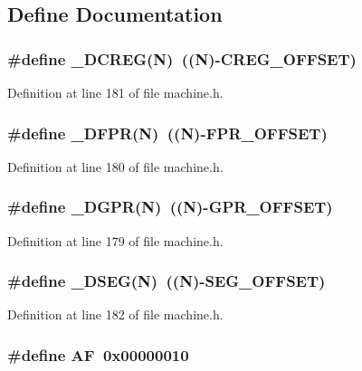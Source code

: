 \subsection{Define Documentation}
\subsubsection[{\_\-DCREG}]{\setlength{\rightskip}{0pt plus 5cm}\#define \_\-DCREG(N)~((N)-CREG\_\-OFFSET)}\label{machine_8h_6f5332d14ef2c1f6eb91a3abdd1a3110}




Definition at line 181 of file machine.h.
\subsubsection[{\_\-DFPR}]{\setlength{\rightskip}{0pt plus 5cm}\#define \_\-DFPR(N)~((N)-FPR\_\-OFFSET)}\label{machine_8h_3e6ac9a1b72cf5803e4606c8de18e122}




Definition at line 180 of file machine.h.
\subsubsection[{\_\-DGPR}]{\setlength{\rightskip}{0pt plus 5cm}\#define \_\-DGPR(N)~((N)-GPR\_\-OFFSET)}\label{machine_8h_e0f0835009dd781333d49514a36ded8d}




Definition at line 179 of file machine.h.
\subsubsection[{\_\-DSEG}]{\setlength{\rightskip}{0pt plus 5cm}\#define \_\-DSEG(N)~((N)-SEG\_\-OFFSET)}\label{machine_8h_42440af496df54cf1da24949ba2b9e0d}




Definition at line 182 of file machine.h.
\subsubsection[{AF}]{\setlength{\rightskip}{0pt plus 5cm}\#define AF~0x00000010}\label{machine_8h_76ba789cde9c36cd57dbb390bdee7661}




